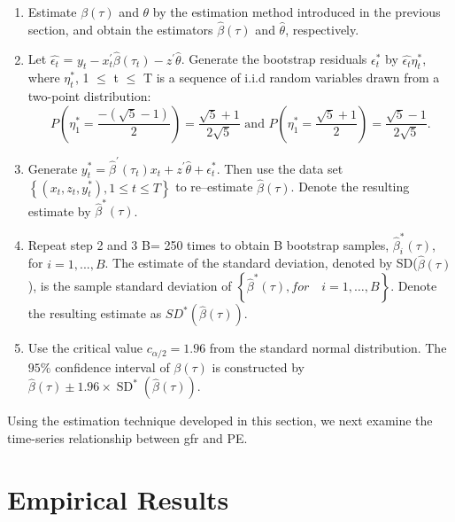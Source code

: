 \documentclass[12pt,a4paper]{article}
\begin{document}
\begin{enumerate}
	\item Estimate $\beta(\tau)$ and $\theta$ by the estimation method introduced in the previous section, and obtain the estimators $\widehat{\beta}(\tau)$ and $\widehat{\theta}$, respectively.
	
	\item Let $\hat{\epsilon_{t}}$ = $y_t - x_t^{\prime} \widehat{\beta}(\tau_{t})  - z^{\prime}\widehat{\theta}$. Generate the bootstrap residuals {$\epsilon_{t}^*$} by   $\hat{\epsilon_{t}}\eta_t^*$, where {$\eta_t^*$, 1 $\leq$ t $\leq$ T} is a sequence of i.i.d random variables drawn from a two-point distribution:
	$$
	P\left(\eta_{1}^{*}=\frac{-(\sqrt{5}-1)}{2}\right)=\frac{\sqrt{5}+1}{2 \sqrt{5}} \text { and } P\left(\eta_{1}^{*}=\frac{\sqrt{5}+1}{2}\right)=\frac{\sqrt{5}-1}{2 \sqrt{5}}.
	$$
	
	\item  Generate $y_{t}^{*}=\widehat{\beta}^{\prime}(\tau_t) x_{t} + z^{\prime}\widehat{\theta} +\epsilon_{t}^{*}$. Then use the data set $\left\{\left(x_{t}, z_{t}, y_{t}^{*}\right), 1 \leq t \leq T\right\}$ to re--estimate $\hat{\beta}(\tau)$. Denote the resulting estimate by $\widehat{\beta}^*(\tau)$.
	
	\item Repeat step 2 and 3 B= 250 times to obtain B bootstrap samples, $\widehat{\beta}_i^*(\tau)$, for $i = 1,..., B$. The estimate of the standard deviation, denoted by SD($\widehat{\beta}(\tau)$), is the sample standard deviation of $\left\{\widehat{\beta}^{*}(\tau), for \quad i=1, \ldots, B\right\}$. Denote the resulting estimate as $SD^*(\widehat{\beta}(\tau))$.
	
	\item Use the critical value $c_{\alpha / 2} = 1.96$ from the standard normal distribution. The $95\%$ confidence interval of $\beta(\tau)$ is constructed by $\widehat{\beta}(\tau) \pm 1.96 \times \operatorname{SD}^{*}\left(\widehat{\beta}(\tau)\right)$.
\end{enumerate}

Using the estimation technique developed in this section, we next examine the time-series relationship between gfr and PE. 


\section{Empirical Results}

	\cite{crump2011fertility} 
	
\end{document}
